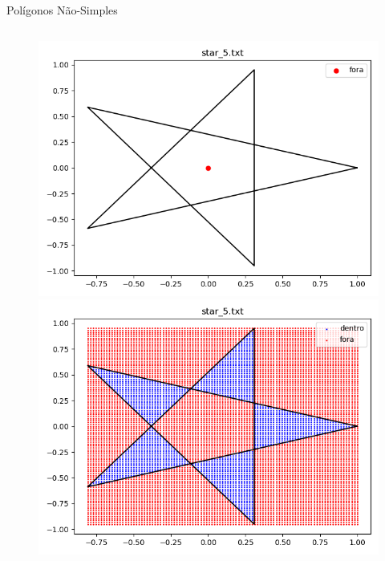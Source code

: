 \documentclass[aspectratio=169,usenames,dvipsnames]{beamer}
\begin{document}
\begin{frame}{Polígonos Não-Simples}
\begin{columns}
    \begin{center}
      \begin{figure}
        \begin{overprint}
        \includegraphics[width=1.0\textwidth]{figures/star_5.png}
        \includegraphics[width=1.0\textwidth]{figures/star_5_grid.png}
        \end{overprint}
      \end{figure}
    \end{center}
  \end{columns}

\end{frame}
\end{document}
